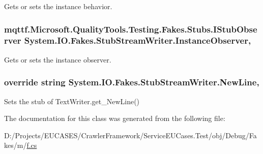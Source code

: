 Gets or sets the instance behavior.

\hypertarget{class_system_1_1_i_o_1_1_fakes_1_1_stub_stream_writer_af6430fd0b73cae7068f939735fe67530}{
\subsubsection[{Instance\-Observer}]{\setlength{\rightskip}{0pt plus 5cm}mqttf.\-Microsoft.\-Quality\-Tools.\-Testing.\-Fakes.\-Stubs.\-I\-Stub\-Observer System.\-I\-O.\-Fakes.\-Stub\-Stream\-Writer.\-Instance\-Observer\hspace{0.3cm}{\ttfamily [get]}, {\ttfamily [set]}}}\label{class_system_1_1_i_o_1_1_fakes_1_1_stub_stream_writer_af6430fd0b73cae7068f939735fe67530}


Gets or sets the instance observer.

\hypertarget{class_system_1_1_i_o_1_1_fakes_1_1_stub_stream_writer_af8fbedb65b4d78881a6bfc6a8a29efb3}{
\subsubsection[{New\-Line}]{\setlength{\rightskip}{0pt plus 5cm}override string System.\-I\-O.\-Fakes.\-Stub\-Stream\-Writer.\-New\-Line\hspace{0.3cm}{\ttfamily [get]}, {\ttfamily [set]}}}\label{class_system_1_1_i_o_1_1_fakes_1_1_stub_stream_writer_af8fbedb65b4d78881a6bfc6a8a29efb3}


Sets the stub of Text\-Writer.\-get\-\_\-\-New\-Line()



The documentation for this class was generated from the following file\-:\begin{DoxyCompactItemize}
\item 
D\-:/\-Projects/\-E\-U\-C\-A\-S\-E\-S/\-Crawler\-Framework/\-Service\-E\-U\-Cases.\-Test/obj/\-Debug/\-Fakes/m/\hyperlink{m_2f_8cs}{f.\-cs}\end{DoxyCompactItemize}
